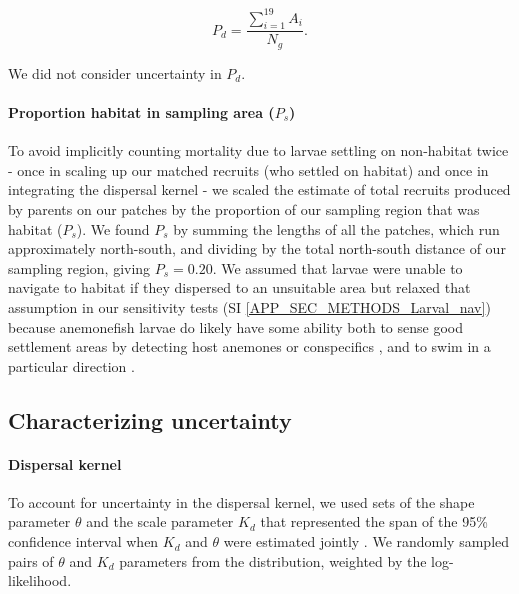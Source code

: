 \documentclass[12pt, oneside]{article}   	%
\begin{document}
\begin{equation}
P_d = \frac{\sum_{i=1}^{19} A_i}{N_g}. \label{EQN_DK_area_within_sampling_region}
\end{equation}

We did not consider uncertainty in $P_d$.

\paragraph{Proportion habitat in sampling area ($P_s$)} \label{APP_SEC_PropHabInSampledRegion}

To avoid implicitly counting mortality due to larvae settling on non-habitat twice - once in scaling up our matched recruits (who settled on habitat) and once in integrating the dispersal kernel - we scaled the estimate of total recruits produced by parents on our patches by the proportion of our sampling region that was habitat ($P_s$). We found $P_s$ by summing the lengths of all the patches, which run approximately north-south, and dividing by the total north-south distance of our sampling region, giving $P_s = 0.20$. We assumed that larvae were unable to navigate to habitat if they dispersed to an unsuitable area but relaxed that assumption in our sensitivity tests (SI \ref{APP_SEC_METHODS_Larval_nav}) because anemonefish larvae do likely have some ability both to sense good settlement areas by detecting host anemones \citep{elliott1995host, arvedlund1999host} or conspecifics \citep[e.g.,][for coral reef fish more broadly]{lecchini2005experimental}, and to swim in a particular direction \citep[e.g.,][]{bellwood2001relative, fisher2005swimming}. 

\subsection{Characterizing uncertainty} \label{APP_SEC_Uncertainty}

\paragraph{Dispersal kernel} \label{APP_SEC_Uncertainty_Dispersal}

To account for uncertainty in the dispersal kernel, we used sets of the shape parameter $\theta$ and the scale parameter $K_d$ that represented the span of the 95\% confidence interval when $K_d$ and $\theta$ were estimated jointly \citep[Table \ref{APP_TAB_Params}, Fig.\ \ref{FIG_ParameterInputs}a,][]{catalanoInPrepconnectivity}. We randomly sampled pairs of $\theta$ and $K_d$ parameters from the distribution, weighted by the log-likelihood.
\end{document}

